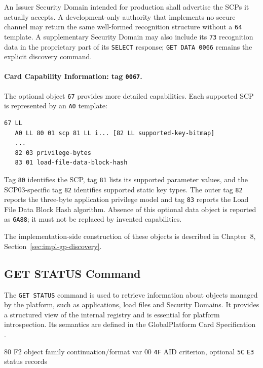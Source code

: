 An Issuer Security Domain intended for production shall advertise the SCPs it
actually accepts. A development-only authority that implements no secure
channel may return the same well-formed recognition structure without a
\texttt{64} template. A supplementary Security Domain may also include its
\texttt{73} recognition data in the proprietary part of its \texttt{SELECT}
response; \texttt{GET DATA 0066} remains the explicit discovery command.

\paragraph{Card Capability Information: tag \texttt{0067}.}

The optional object \texttt{67} provides more detailed capabilities. Each
supported SCP is represented by an \texttt{A0} template:

\begin{verbatim}
67 LL
   A0 LL 80 01 scp 81 LL i... [82 LL supported-key-bitmap]
   ...
   82 03 privilege-bytes
   83 01 load-file-data-block-hash
\end{verbatim}

Tag \texttt{80} identifies the SCP, tag \texttt{81} lists its supported
parameter values, and the SCP03-specific tag \texttt{82} identifies supported
static key types. The outer tag \texttt{82} reports the three-byte application
privilege model and tag \texttt{83} reports the Load File Data Block Hash
algorithm. Absence of this optional data object is reported as
\texttt{6A88}; it must not be replaced by invented capabilities.

The implementation-side construction of these objects is described in
Chapter~8, Section~\ref{sec:impl-gp-discovery}.

\subsection{GET STATUS Command}

The \texttt{GET STATUS} command is used to retrieve information about objects
managed by the platform, such as applications, load files and Security Domains.
It provides a structured view of the internal registry and is essential for
platform introspection. Its semantics are defined in the GlobalPlatform Card
Specification .

\apdudesc
{80}
{F2}
{object family}
{continuation/format}
{var}
{00}
{\texttt{4F} AID criterion, optional \texttt{5C}}
{\texttt{E3} status records}

